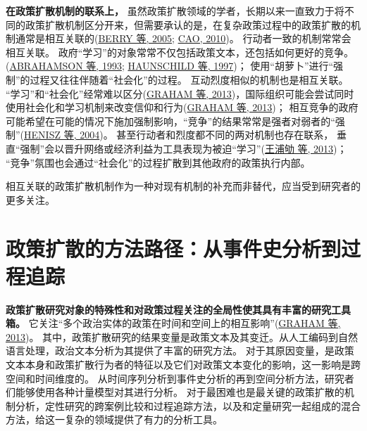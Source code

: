 \documentclass[
  12pt,
]{ctexart}
\begin{document}
\textbf{在政策扩散机制的联系上，}
虽然政策扩散领域的学者，长期以来一直致力于将不同的政策扩散机制区分开来，但需要承认的是，在复杂政策过程中的政策扩散的机制通常是相互关联的(\protect\hyperlink{ref-BerryBaybeck2005}{BERRY 等, 2005}; \protect\hyperlink{ref-Cao2010}{CAO, 2010})。
行动者一致的机制常常会相互关联。
政府``学习''的对象常常不仅包括政策文本，还包括如何更好的竞争。(\protect\hyperlink{ref-AbrahamsonRosenkopf1993}{ABRAHAMSON 等, 1993}; \protect\hyperlink{ref-HaunschildMiner1997}{HAUNSCHILD 等, 1997})；
使用``胡萝卜''进行``强制''的过程又往往伴随着``社会化''的过程。
互动烈度相似的机制也是相互关联。
``学习''和``社会化''经常难以区分(\protect\hyperlink{ref-GrahamEtAl2013}{GRAHAM 等, 2013})，国际组织可能会尝试同时使用社会化和学习机制来改变信仰和行为(\protect\hyperlink{ref-GrahamEtAl2013}{GRAHAM 等, 2013})；
相互竞争的政府可能希望在可能的情况下施加强制影响，``竞争''的结果常常是强者对弱者的``强制''(\protect\hyperlink{ref-HeniszEtAl2004}{HENISZ 等, 2004})。
甚至行动者和烈度都不同的两对机制也存在联系，
垂直``强制''会以晋升网络或经济利益为工具表现为被迫``学习''(\protect\hyperlink{ref-WangPuQuLaiXianJin2013}{王浦劬 等, 2013})；
``竞争''氛围也会通过``社会化''的过程扩散到其他政府的政策执行内部。

相互关联的政策扩散机制作为一种对现有机制的补充而非替代，应当受到研究者的更多关注。

\newpage

\hypertarget{ux653fux7b56ux6269ux6563ux7684ux65b9ux6cd5ux8defux5f84ux4eceux4e8bux4ef6ux53f2ux5206ux6790ux5230ux8fc7ux7a0bux8ffdux8e2a}{%
\section{政策扩散的方法路径：从事件史分析到过程追踪}\label{ux653fux7b56ux6269ux6563ux7684ux65b9ux6cd5ux8defux5f84ux4eceux4e8bux4ef6ux53f2ux5206ux6790ux5230ux8fc7ux7a0bux8ffdux8e2a}}

\textbf{政策扩散研究对象的特殊性和对政策过程关注的全局性使其具有丰富的研究工具箱。}
它关注``多个政治实体的政策在时间和空间上的相互影响''(\protect\hyperlink{ref-GrahamEtAl2013}{GRAHAM 等, 2013})。
其中，政策扩散研究的结果变量是政策文本及其变迁。从人工编码到自然语言处理，政治文本分析为其提供了丰富的研究方法。
对于其原因变量，是政策文本本身和政策扩散行为者的特征以及它们对政策文本变化的影响，这一影响是跨空间和时间维度的。
从时间序列分析到事件史分析的再到空间分析方法，研究者们能够使用各种计量模型对其进行分析。
对于最困难也是最关键的政策扩散的机制分析，定性研究的跨案例比较和过程追踪方法，以及和定量研究一起组成的混合方法，给这一复杂的领域提供了有力的分析工具。
\end{document}
